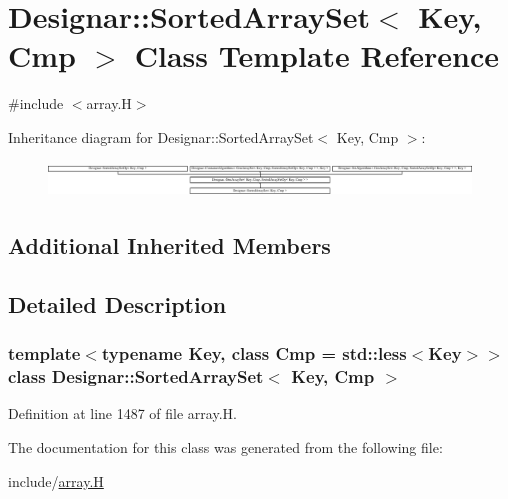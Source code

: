 \hypertarget{class_designar_1_1_sorted_array_set}{}\section{Designar\+:\+:Sorted\+Array\+Set$<$ Key, Cmp $>$ Class Template Reference}
\label{class_designar_1_1_sorted_array_set}


{\ttfamily \#include $<$array.\+H$>$}

Inheritance diagram for Designar\+:\+:Sorted\+Array\+Set$<$ Key, Cmp $>$\+:\begin{figure}[H]
\begin{center}
\leavevmode
\includegraphics[height=0.942761cm]{class_designar_1_1_sorted_array_set}
\end{center}
\end{figure}
\subsection*{Additional Inherited Members}


\subsection{Detailed Description}
\subsubsection*{template$<$typename Key, class Cmp = std\+::less$<$\+Key$>$$>$\newline
class Designar\+::\+Sorted\+Array\+Set$<$ Key, Cmp $>$}



Definition at line 1487 of file array.\+H.



The documentation for this class was generated from the following file\+:\begin{DoxyCompactItemize}
\item 
include/\hyperlink{array_8_h}{array.\+H}\end{DoxyCompactItemize}

